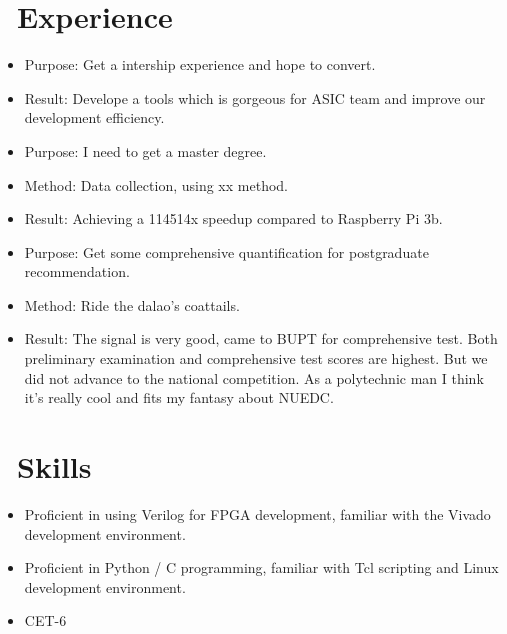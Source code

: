 \documentclass{resume}
\begin{document}
\section{\faUsers\ Experience}
\begin{itemize}
  \item Purpose: Get a intership experience and hope to convert.
  \item Result: Develope a tools which is gorgeous for ASIC team and improve our development efficiency.
\end{itemize}

\begin{itemize}
  \item Purpose: I need to get a master degree.
  \item Method: Data collection, using xx method.
  \item Result: Achieving a 114514x speedup compared to Raspberry Pi 3b.
\end{itemize}

\begin{itemize}
  \item Purpose: Get some comprehensive quantification for postgraduate recommendation.
  \item Method: Ride the dalao's coattails.
  \item Result: The signal is very good, came to BUPT for comprehensive test. Both preliminary examination and comprehensive test scores are highest. But we did not advance to the national competition. As a polytechnic man I think it's really cool and fits my fantasy about NUEDC.
\end{itemize}

\section{\faCogs\ Skills}
\begin{itemize}[parsep=0.5ex]
  \item Proficient in using Verilog for FPGA development, familiar with the Vivado development environment.
  \item Proficient in Python / C programming, familiar with Tcl scripting and Linux development environment.
  \item CET-6
\end{itemize}
\end{document}
